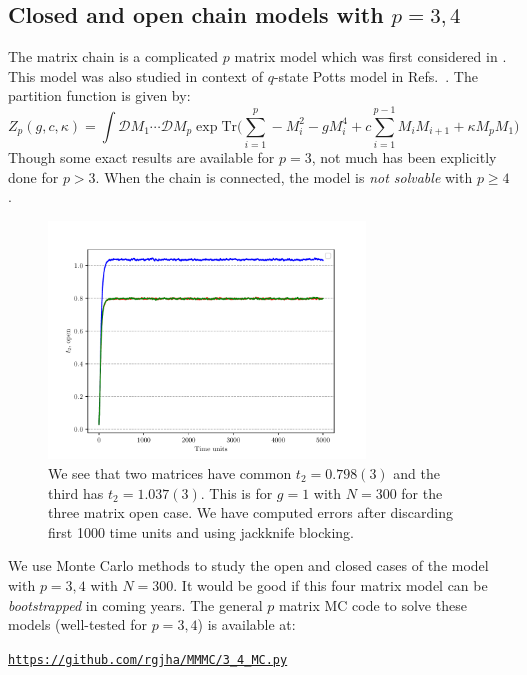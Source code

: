 \documentclass[11pt]{article}
\begin{document}
\subsection{\label{subsection:Mchain}Closed and open chain models with $p = 3, 4$}

The matrix chain is a complicated $p$ matrix model which was first 
considered in \cite{Chadha:1980ri}. This model was also studied in context 
of $q$-state Potts model in Refs.~\cite{KAZAKOV198893, KOSTOV1989295, Daul:1994qy}.
The partition function is given by: 
\begin{equation}
	\label{eq:Mehta1} 
	Z_{p}(g,c,\kappa) = \int \mathcal{D}M_{1} \cdots  \mathcal{D}M_{p} \exp \mbox{Tr} \Bigg(\sum_{i=1}^{p} -M_{i}^2  - g M_{i}^{4} + c \sum_{i=1}^{p-1} M_{i}M_{i+1} 
	+ \kappa M_{p}M_{1} \Bigg)
\end{equation}
Though some exact results are available for $p=3$, not much has been explicitly done 
for $p > 3$. When the chain is connected, the 
model is \emph{not solvable} with $p \ge 4$. 
\begin{figure}[htbp] 
	\centering 
	\includegraphics[width=0.75\textwidth]{figs/3MM_open.pdf}
	\caption{\label{fig:3MM_open}We see that two matrices have common $t_{2} = 0.798(3)$ and the third has 
	$t_{2} = 1.037(3)$. This is for $g=1$ with $N=300$ for the three matrix open case. We have computed errors after discarding first 1000 time units and using jackknife blocking.}
\end{figure}
We use Monte Carlo methods to study the open and closed cases of the model with $p = 3,4$ with 
$N = 300$. It would be good if this four matrix model can be \textit{bootstrapped} in coming years. 
The general $p$ matrix MC code to solve these models 
(well-tested for $p = 3,4$) is available at: 
\begin{center} \texttt{\href{https://github.com/rgjha/MMMC/3\_4\ _MC.py}{https://github.com/rgjha/MMMC/3\_4\_MC.py}} \end{center}
\end{document}
